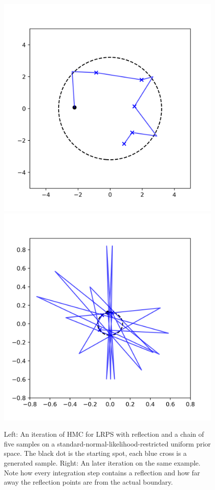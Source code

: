 \documentclass[12pt, a4paper]{report}
\begin{document}
\begin{figure}
    \centering
    \includegraphics[scale=0.45]{figs/hmc_reflection_example.png}
    \includegraphics[scale=0.45]{figs/hmc_reflection_degenerate_example.png}
    \caption{Left: An iteration of HMC for LRPS with reflection and a chain of five samples on a standard-normal-likelihood-restricted uniform prior space.
    The black dot is the starting spot, each blue cross is a generated sample. Right: An later iteration on the same example. Note how every integration step contains a reflection and how far away the reflection points are from the actual boundary.}
    \label{fig:hmc_reflection_example}
\end{figure}
\end{document}
